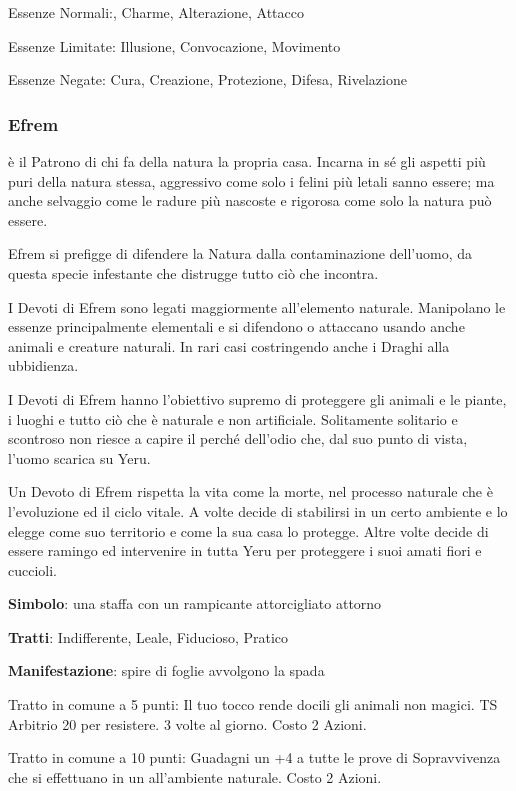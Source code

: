 \documentclass[a4paper,11pt,twoside,openany]{book}
\begin{document}
Essenze Normali:, Charme, Alterazione, Attacco

Essenze Limitate: Illusione, Convocazione, Movimento

Essenze Negate: Cura, Creazione, Protezione, Difesa, Rivelazione

\subsubsection{Efrem}

\label{efrem}

è il Patrono di chi fa della natura la propria casa. Incarna in sé gli aspetti più puri della natura stessa, aggressivo come solo i felini più letali sanno essere; ma anche selvaggio come le radure più nascoste e rigorosa come solo la natura può essere.

Efrem si prefigge di difendere la Natura dalla contaminazione dell'uomo, da questa specie infestante che distrugge tutto ciò che incontra.

I Devoti di Efrem sono legati maggiormente all'elemento naturale. Manipolano le essenze principalmente elementali e si difendono o attaccano usando anche animali e creature naturali. In rari casi costringendo anche i Draghi alla ubbidienza.

I Devoti di Efrem hanno l'obiettivo supremo di proteggere gli animali e le piante, i luoghi e tutto ciò che è naturale e non artificiale. Solitamente solitario e scontroso non riesce a capire il perché dell'odio che, dal suo punto di vista, l'uomo scarica su Yeru.

Un Devoto di Efrem rispetta la vita come la morte, nel processo naturale che è l'evoluzione ed il ciclo vitale. A volte decide di stabilirsi in un certo ambiente e lo elegge come suo territorio e come la sua casa lo protegge. Altre volte decide di essere ramingo ed intervenire in tutta Yeru per proteggere i suoi amati fiori e cuccioli.

\textbf{Simbolo}: una staffa con un rampicante attorcigliato attorno

\textbf{Tratti}: Indifferente, Leale, Fiducioso, Pratico

\textbf{Manifestazione}: spire di foglie avvolgono la spada

\bigskip

Tratto in comune a 5 punti: Il tuo tocco rende docili gli animali non magici. TS Arbitrio 20 per resistere. 3 volte al giorno. Costo 2 Azioni.

Tratto in comune a 10 punti: Guadagni un +4 a tutte le prove di Sopravvivenza che si effettuano in un all'ambiente naturale. Costo 2 Azioni.
\end{document}
